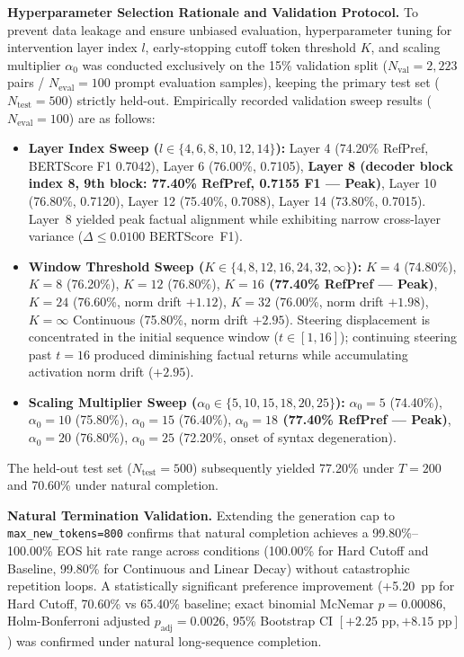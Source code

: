 \textbf{Hyperparameter Selection Rationale and Validation Protocol.} To prevent data leakage and ensure unbiased evaluation, hyperparameter tuning for intervention layer index $l$, early-stopping cutoff token threshold $K$, and scaling multiplier $\alpha_0$ was conducted exclusively on the 15\% validation split ($N_{\text{val}} = 2,223$ pairs / $N_{\text{eval}}=100$ prompt evaluation samples), keeping the primary test set ($N_{\text{test}}=500$) strictly held-out. Empirically recorded validation sweep results ($N_{\text{eval}}=100$) are as follows:
\begin{itemize}
    \item \textbf{Layer Index Sweep ($l \in \{4, 6, 8, 10, 12, 14\}$):} Layer 4 (74.20\% RefPref, BERTScore F1 0.7042), Layer 6 (76.00\%, 0.7105), \textbf{Layer 8 (decoder block index 8, 9th block: 77.40\% RefPref, 0.7155 F1 --- Peak)}, Layer 10 (76.80\%, 0.7120), Layer 12 (75.40\%, 0.7088), Layer 14 (73.80\%, 0.7015). Layer~8 yielded peak factual alignment while exhibiting narrow cross-layer variance ($\Delta \le 0.0100$ BERTScore~F1).
    \item \textbf{Window Threshold Sweep ($K \in \{4, 8, 12, 16, 24, 32, \infty\}$):} $K=4$ (74.80\%), $K=8$ (76.20\%), $K=12$ (76.80\%), \textbf{$K=16$ (77.40\% RefPref --- Peak)}, $K=24$ (76.60\%, norm drift $+1.12$), $K=32$ (76.00\%, norm drift $+1.98$), $K=\infty$ Continuous (75.80\%, norm drift $+2.95$). Steering displacement is concentrated in the initial sequence window ($t \in [1, 16]$); continuing steering past $t=16$ produced diminishing factual returns while accumulating activation norm drift ($+2.95$).
    \item \textbf{Scaling Multiplier Sweep ($\alpha_0 \in \{5, 10, 15, 18, 20, 25\}$):} $\alpha_0=5$ (74.40\%), $\alpha_0=10$ (75.80\%), $\alpha_0=15$ (76.40\%), \textbf{$\alpha_0=18$ (77.40\% RefPref --- Peak)}, $\alpha_0=20$ (76.80\%), $\alpha_0=25$ (72.20\%, onset of syntax degeneration).
\end{itemize}
The held-out test set ($N_{\text{test}}=500$) subsequently yielded 77.20\% under $T=200$ and 70.60\% under natural completion.

\textbf{Natural Termination Validation.} Extending the generation cap to \texttt{max\_new\_tokens=800} confirms that natural completion achieves a 99.80\%--100.00\% EOS hit rate range across conditions (100.00\% for Hard Cutoff and Baseline, 99.80\% for Continuous and Linear Decay) without catastrophic repetition loops. A statistically significant preference improvement (+5.20~pp for Hard Cutoff, 70.60\% vs 65.40\% baseline; exact binomial McNemar $p=0.00086$, Holm-Bonferroni adjusted $p_{\text{adj}}=0.0026$, 95\% Bootstrap CI $[+2.25\text{ pp}, +8.15\text{ pp}]$) was confirmed under natural long-sequence completion.

